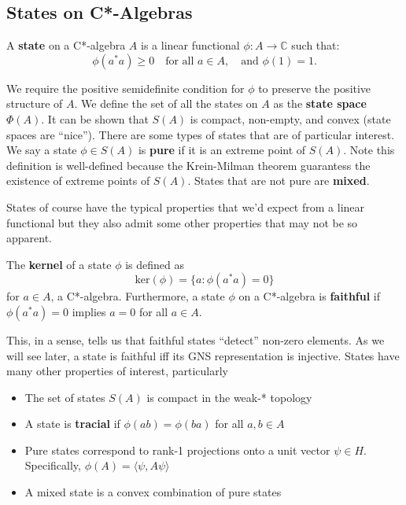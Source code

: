 \subsection{States on C*-Algebras}
\begin{definition}
A \textbf{state} on a C*-algebra \( A \) is a linear functional \( \phi: A \to \mathbb{C} \) such that:
\[
\phi(a^*a) \geq 0 \quad \text{for all } a \in A, \quad \text{and } \phi(1) = 1.
\]
\end{definition}


We require the positive semidefinite condition for $\phi$ to preserve the positive structure
of $A$. We define the set of all the states on $A$ as the \textbf{state space} $\Phi(A)$. It
can be shown that $S(A)$ is compact, non-empty, and convex (state spaces are ``nice'').
There are some types of states that are of particular interest. 
We say a state $\phi \in S(A)$ is \textbf{pure} if it is an extreme point of $S(A)$.
Note this definition is well-defined because the Krein-Milman theorem guarantess
the existence of extreme points of $S(A)$. States that are not pure are \textbf{mixed}.

\par

States of course have the typical properties that we'd expect from a linear functional
but they also admit some other properties that may not be so apparent. 

\begin{definition}
    The \textbf{kernel} of a state $\phi$ is defined as
    \begin{equation*}
        \text{ker}(\phi) = \{a : \phi(a^*a) = 0 \}
    \end{equation*}
    for $a \in A$, a C*-algebra. Furthermore, a state $\phi$ on a C*-algebra
    is \textbf{faithful} if $\phi(a^*a) = 0$ implies $a=0$ for all $a \in A$.
\end{definition}

This, in a sense, tells us that faithful states ``detect'' non-zero elements. As we will see
later, a state is faithful iff its GNS representation is injective. States have many other properties of interest, particularly
\begin{itemize}
    \item The set of states $S(A)$ is compact in the weak-* topology
    \item A state is \textbf{tracial} if $\phi(ab) = \phi(ba)$ for all $a,b \in A$
    \item Pure states correspond to rank-1 projections onto a unit vector $\psi \in H$.
    Specifically, $\phi(A) = \langle \psi, A\psi \rangle$
    \item A mixed state is a convex combination of pure states
\end{itemize}